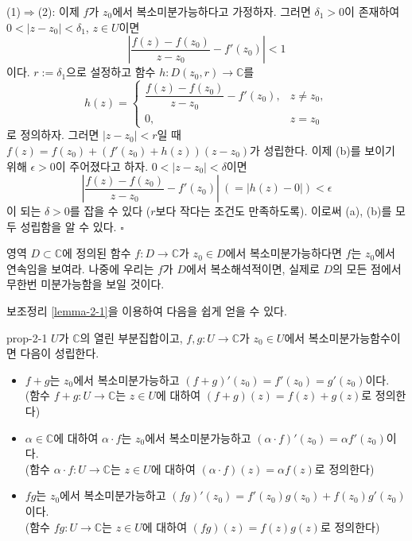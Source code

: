(1)$\Rightarrow$(2):
이제 $f$가 $z_0$에서 복소미분가능하다고 가정하자. 
그러면 $\delta_1>0$이 존재하여 \\
$0<|z-z_0|<\delta_1$, $z\in U$이면 
\[
\left|  \dfrac{f(z) - f(z_0)}{z - z_0}  - f'(z_0) \right| < 1
\]
이다.
$r:=\delta_1$으로 설정하고 함수 $h:D(z_0,r) \to \mathbb C$를 
\[
h(z) = \begin{cases}
\dfrac{f(z) - f(z_0)}{z - z_0} - f'(z_0), & z\ne z_0, \\
0, & z= z_0
\end{cases}
\]
로 정의하자.
그러면 $|z-z_0|<r$일 때
$f(z) = f(z_0) + \left( f'(z_0) + h(z)\right) (z - z_0)$가 성립한다.
이제 (b)를 보이기 위해 $\epsilon>0$이 주어졌다고 하자.
$0<|z-z_0|<\delta$이면
\[
\left|  \dfrac{f(z) - f(z_0)}{z - z_0}  - f'(z_0) \right| \ \left( = |h(z) - 0| \right) < \epsilon
\]
이 되는 $\delta>0$를 잡을 수 있다 ($r$보다 작다는 조건도 만족하도록).
이로써 (a), (b)를 모두 성립함을 알 수 있다. \hfill $\square$

\begin{salt_exercise} \label{ex-2-3}
영역 $D\subset \mathbb C$에 정의된 함수 $f:D\to \mathbb C$가 
$z_0\in D$에서 복소미분가능하다면 $f$는 $z_0$에서 연속임을 보여라.
나중에 우리는 $f$가 $D$에서 복소해석적이면, 
실제로 $D$의 모든 점에서 무한번 미분가능함을 보일 것이다.
\end{salt_exercise}

보조정리 \ref{lemma-2-1}을 이용하여 다음을 쉽게 얻을 수 있다.

\begin{saltprop}[]{prop-2-1} %
$U$가 $\mathbb C$의 열린 부분집합이고,
$f,g: U\to \mathbb C$가 $z_0\in U$에서 복소미분가능함수이면
다음이 성립한다.
\begin{itemize}
\item[(1)] $f+g$는 $z_0$에서 복소미분가능하고
$(f+g)'(z_0) = f'(z_0) = g'(z_0)$이다. \\
(함수 $f+g:U\to\mathbb C$는 $z\in U$에 대하여 $(f+g)(z) = f(z)+g(z)$로 정의한다)
\item[(2)] $\alpha\in\mathbb C$에 대하여 $\alpha\cdot f$는 $z_0$에서 복소미분가능하고
$(\alpha\cdot f)'(z_0) = \alpha f'(z_0)$이다. \\
(함수 $\alpha \cdot f:U\to\mathbb C$는 $z\in U$에 대하여 
$(\alpha \cdot f)(z) = \alpha f(z)$로 정의한다)
\item[(3)] $fg$는 $z_0$에서 복소미분가능하고
$(fg)'(z_0) = f'(z_0)g(z_0) + f(z_0)g'(z_0)$이다.\\
(함수 $fg:U\to\mathbb C$는 $z\in U$에 대하여 
$(fg)(z)= f(z)g(z)$로 정의한다)
\end{itemize}
\end{saltprop}

